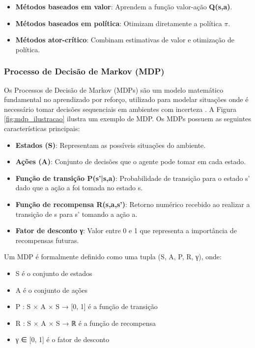 \begin{itemize}
\item \textbf{Métodos baseados em valor}: Aprendem a função valor-ação \textbf{Q(s,a)}.
\item \textbf{Métodos baseados em política}: Otimizam diretamente a política \textbf{$\pi$}.
\item \textbf{Métodos ator-crítico}: Combinam estimativas de valor e otimização de política.
\end{itemize}

\subsubsection{Processo de Decisão de Markov (MDP)}
\label{subsubsec:mdp}

Os Processos de Decisão de Markov (MDPs) são um modelo matemático fundamental no aprendizado por reforço, utilizado para modelar situações onde é necessário tomar decisões sequenciais em ambientes com incerteza \cite{introducao_modelos_probabilisticos}. A Figura \ref{fig:mdp_ilustracao} ilustra um exemplo de MDP. Os MDPs possuem as seguintes características principais:

\begin{itemize}
\item \textbf{Estados (S)}: Representam as possíveis situações do ambiente.
\item \textbf{Ações (A)}: Conjunto de decisões que o agente pode tomar em cada estado.
\item \textbf{Função de transição P(s'|s,a)}: Probabilidade de transição para o estado s' dado que a ação a foi tomada no estado s.
\item \textbf{Função de recompensa R(s,a,s')}: Retorno numérico recebido ao realizar a transição de s para s' tomando a ação a.
\item \textbf{Fator de desconto γ}: Valor entre 0 e 1 que representa a importância de recompensas futuras.
\end{itemize}

Um MDP é formalmente definido como uma tupla (S, A, P, R, γ), onde:

\begin{itemize}
\item S é o conjunto de estados
\item A é o conjunto de ações
\item P : S × A × S → [0, 1] é a função de transição
\item R : S × A × S → ℝ é a função de recompensa
\item γ ∈ [0, 1] é o fator de desconto
\end{itemize}

